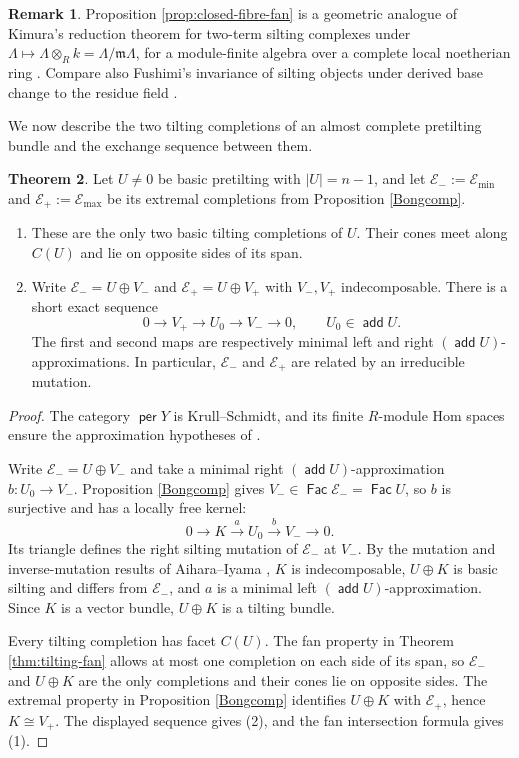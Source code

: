 \documentclass[a4paper,reqno]{amsart}
\def\E{\mathcal{E}}
\def\m{\mathfrak{m}}
\DeclareMathOperator{\add}{\mathsf{add}}
\DeclareMathOperator{\Fac}{\mathsf{Fac}}
\DeclareMathOperator{\per}{\mathsf{per}}
\theoremstyle{definition}
\newtheorem{Thm}{Theorem}[section]
\newtheorem{Rem}[Thm]{Remark}
\begin{document}
\begin{Rem}
Proposition \ref{prop:closed-fibre-fan} is a geometric analogue of Kimura's reduction theorem for two-term silting complexes under $\Lambda\mapsto\Lambda\otimes_Rk=\Lambda/\m\Lambda$, for a module-finite algebra over a complete local noetherian ring \cite[Theorem 4.3]{Kim24}. Compare also Fushimi's invariance of silting objects under derived base change to the residue field \cite[Theorem 4.9]{Fus26}.
\end{Rem}

We now describe the two tilting completions of an almost complete pretilting bundle and the exchange sequence between them.

\begin{Thm}\label{thm:facet-mutation}
Let $U\ne0$ be basic pretilting with $|U|=n-1$, and let $\E_-:=\E_{\min}$ and $\E_+:=\E_{\max}$ be its extremal completions from Proposition \ref{Bongcomp}.
\begin{enumerate}
\item These are the only two basic tilting completions of $U$. Their cones meet along $C(U)$ and lie on opposite sides of its span.
\item Write $\E_-=U\oplus V_-$ and $\E_+=U\oplus V_+$ with $V_-,V_+$ indecomposable. There is a short exact sequence
\[
0\longrightarrow V_+\longrightarrow U_0\longrightarrow V_-\longrightarrow0,
\qquad U_0\in\add U.
\]
The first and second maps are respectively minimal left and right $(\add U)$-approximations. In particular, $\E_-$ and $\E_+$ are related by an irreducible mutation.
\end{enumerate}
\end{Thm}
\begin{proof}
The category $\per Y$ is Krull--Schmidt, and its finite $R$-module Hom spaces ensure the approximation hypotheses of \cite[Section 2.4]{AI}.

Write $\E_-=U\oplus V_-$ and take a minimal right $(\add U)$-approximation $b\colon U_0\to V_-$. Proposition \ref{Bongcomp} gives $V_-\in\Fac\E_-=\Fac U$, so $b$ is surjective and has a locally free kernel:
\[
0\longrightarrow K\xrightarrow{a}U_0\xrightarrow{b}V_-\longrightarrow0.
\]
Its triangle defines the right silting mutation of $\E_-$ at $V_-$. By the mutation and inverse-mutation results of Aihara--Iyama \cite[Theorem 2.31, Proposition 2.33 and Theorem 2.35]{AI}, $K$ is indecomposable, $U\oplus K$ is basic silting and differs from $\E_-$, and $a$ is a minimal left $(\add U)$-approximation. Since $K$ is a vector bundle, $U\oplus K$ is a tilting bundle.

Every tilting completion has facet $C(U)$. The fan property in Theorem \ref{thm:tilting-fan} allows at most one completion on each side of its span, so $\E_-$ and $U\oplus K$ are the only completions and their cones lie on opposite sides. The extremal property in Proposition \ref{Bongcomp} identifies $U\oplus K$ with $\E_+$, hence $K\cong V_+$. The displayed sequence gives (2), and the fan intersection formula gives (1).
\end{proof}
\end{document}
